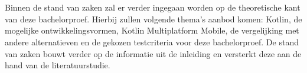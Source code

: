 \chapter{}
\label{ch:stand-van-zaken}

Binnen de stand van zaken zal er verder ingegaan worden op de theoretische kant van deze bachelorproef. Hierbij zullen volgende thema's aanbod komen: Kotlin, de mogelijke ontwikkelingsvormen, Kotlin Multiplatform Mobile, de vergelijking met andere alternatieven en de gekozen testcriteria voor deze bachelorproef. De stand van zaken bouwt verder op de informatie uit de inleiding en versterkt deze aan de hand van de literatuurstudie. 


%
%
%
%

\section{}
\label{sec:SVZkotlin}



